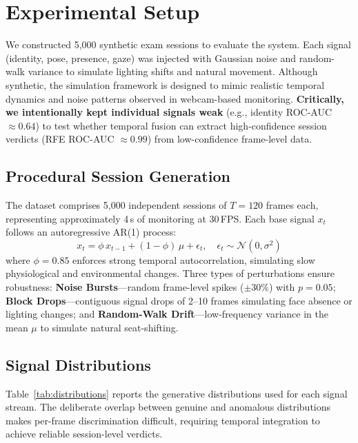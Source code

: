 \documentclass[conference]{IEEEtran}
\begin{document}
\section{Experimental Setup}

We constructed 5{,}000 synthetic exam sessions to evaluate the system. Each signal (identity, pose, presence, gaze) was injected with Gaussian noise and random-walk variance to simulate lighting shifts and natural movement. Although synthetic, the simulation framework is designed to mimic realistic temporal dynamics and noise patterns observed in webcam-based monitoring. \textbf{Critically, we intentionally kept individual signals weak} (e.g., identity ROC-AUC $\approx 0.64$) to test whether temporal fusion can extract high-confidence session verdicts (RFE ROC-AUC $\approx 0.99$) from low-confidence frame-level data.

\subsection{Procedural Session Generation}
The dataset comprises 5{,}000 independent sessions of $T{=}120$ frames each, representing approximately 4\,s of monitoring at 30\,FPS. Each base signal $x_t$ follows an autoregressive AR(1) process:
\begin{equation}
    x_t = \phi\, x_{t-1} + (1-\phi)\,\mu + \epsilon_t, \quad \epsilon_t \sim \mathcal{N}(0, \sigma^2)
\end{equation}
where $\phi{=}0.85$ enforces strong temporal autocorrelation, simulating slow physiological and environmental changes. Three types of perturbations ensure robustness: \textbf{Noise Bursts}---random frame-level spikes (${\pm}30\%$) with $p{=}0.05$; \textbf{Block Drops}---contiguous signal drops of 2--10 frames simulating face absence or lighting changes; and \textbf{Random-Walk Drift}---low-frequency variance in the mean $\mu$ to simulate natural seat-shifting.

\subsection{Signal Distributions}
Table~\ref{tab:distributions} reports the generative distributions used for each signal stream. The deliberate overlap between genuine and anomalous distributions makes per-frame discrimination difficult, requiring temporal integration to achieve reliable session-level verdicts.
\end{document}

